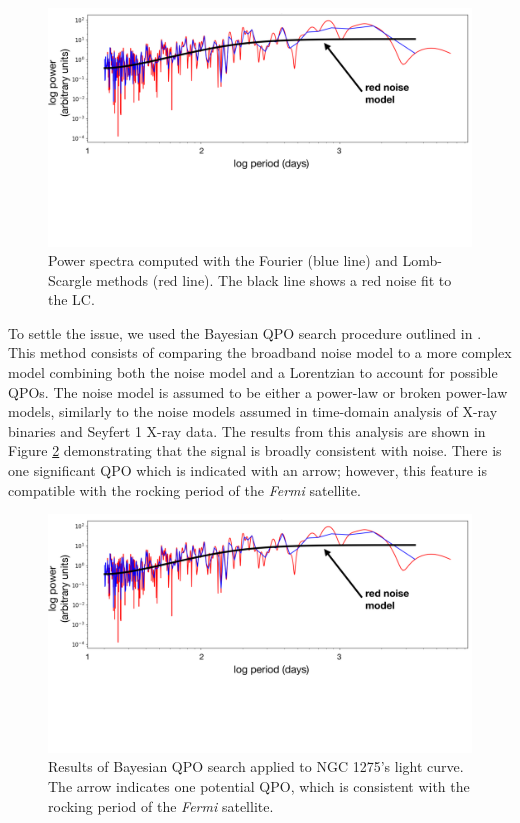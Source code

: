 \documentclass{iau}
\begin{document}
\begin{figure}[h]
\begin{center}
\includegraphics[width=0.8\linewidth, page=1, trim=0 300 0 0,clip=true]{plots.pdf} 
\caption{Power spectra computed with the Fourier (blue line) and  Lomb-Scargle methods (red line). The black line shows a red noise fit to the LC.  }
\label{fourier}
\end{center}
\end{figure}

To settle the issue, we used the Bayesian QPO search procedure outlined in \cite{Huppenkothen2013}. This method consists of comparing the broadband noise model to a more complex model combining both the noise model and a Lorentzian to account for possible QPOs. The noise model is assumed to be either a power-law or broken power-law models, similarly to the noise models assumed in time-domain analysis of X-ray binaries and Seyfert 1 X-ray data. The results from this analysis are shown in Figure \ref{bayes} demonstrating that the signal is broadly consistent with noise. There is one significant QPO which is indicated with an arrow; however, this feature is compatible with the rocking period of the \textit{Fermi} satellite.

\begin{figure}[h]
\begin{center}
\includegraphics[width=\linewidth, page=2, trim=50 0 50 0,clip=true]{plots.pdf} 
\caption{Results of Bayesian QPO search applied to NGC 1275's light curve. The arrow indicates one potential QPO, which is consistent with the rocking period of the \textit{Fermi} satellite. }
\label{bayes}
\end{center}
\end{figure}
\end{document}

